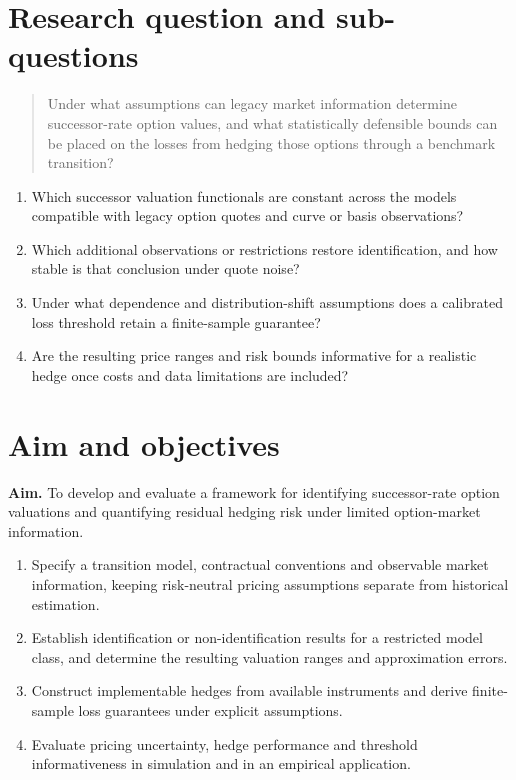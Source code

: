 \documentclass[12pt,final]{article}
\begin{document}
	\section{Research question and sub-questions}

	\begin{quote}
		Under what assumptions can legacy market information determine
		successor-rate option values, and what statistically defensible bounds can
		be placed on the losses from hedging those options through a benchmark
		transition?
	\end{quote}

	\begin{enumerate}
		\item[\textbf{RQ1.}] Which successor valuation functionals are constant across the models compatible with legacy option quotes and curve or basis observations?
		\item[\textbf{RQ2.}] Which additional observations or restrictions restore identification, and how stable is that conclusion under quote noise?
		\item[\textbf{RQ3.}] Under what dependence and distribution-shift assumptions does a calibrated loss threshold retain a finite-sample guarantee?
		\item[\textbf{RQ4.}] Are the resulting price ranges and risk bounds informative for a realistic hedge once costs and data limitations are included?
	\end{enumerate}

	\section{Aim and objectives}

	\textbf{Aim.} To develop and evaluate a framework for identifying
	successor-rate option valuations and quantifying residual hedging risk under
	limited option-market information.

	\begin{enumerate}
		\item Specify a transition model, contractual conventions and observable market information, keeping risk-neutral pricing assumptions separate from historical estimation.
		\item Establish identification or non-identification results for a restricted model class, and determine the resulting valuation ranges and approximation errors.
		\item Construct implementable hedges from available instruments and derive finite-sample loss guarantees under explicit assumptions.
		\item Evaluate pricing uncertainty, hedge performance and threshold informativeness in simulation and in an empirical application.
	\end{enumerate}
\end{document}
